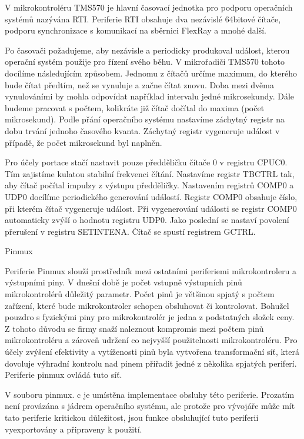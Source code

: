 V mikrokontroléru TMS570 je hlavní časovací jednotka pro podporu operačních systémů nazývána RTI.
Periferie RTI obsahuje dva nezávislé 64bitové čítače, podporu synchronizace s komunikací na sběrnici FlexRay a mnohé další.

Po časovači požadujeme, aby nezávisle a periodicky produkoval událost, kterou operační systém použije pro řízení svého běhu.
V mikrořadiči TMS570 tohoto docílíme následujícím způsobem.
Jednomu z čítačů určíme maximum, do kterého bude čítat předtím, než se vynuluje a začne čítat znovu.
Doba mezi dvěma vynulováními by mohla odpovídat například intervalu jedné mikrosekundy.
Dále budeme pracovat s počtem, kolikráte již čítač dočítal do maxima (počet mikrosekund).
Podle přání operačního systému nastavíme záchytný registr na dobu trvání jednoho časového kvanta.
Záchytný registr vygeneruje událost v případě, že počet mikrosekund byl naplněn.

Pro účely portace stačí nastavit pouze předděličku čítače 0 v registru CPUC0.
Tím zajistíme kulatou stabilní frekvenci čítání.
Nastavíme registr TBCTRL tak, aby čítač počítal impulzy z výstupu předděličky.
Nastavením registrů COMP0 a UDP0 docílíme periodického generování událostí.
Registr COMP0 obsahuje číslo, při kterém čítač vygeneruje událost.
Při vygenerování události se registr COMP0 automaticky zvýší o hodnotu registru UDP0.
Jako poslední se nastaví povolení přerušení v registru SETINTENA.
Čítač se spustí registrem GCTRL.

\secc    Pinmux

Periferie Pinmux slouží prostředník mezi ostatními periferiemi mikrokontroleru a výstupními piny.
V dnešní době je počet vstupně výstupních pinů mikrokontrolérů důležitý parametr.
Počet pinů je většinou spjatý s počtem zařízení, které bude mikrokontroler schopen obsluhovat či kontrolovat.
Bohužel pouzdro s fyzickými piny pro mikrokontrolér je jedna z podstatných složek ceny.
Z tohoto důvodu se firmy snaží naleznout kompromis mezi počtem pinů mikrokontroléru a zároveň udržení co nejvyšší použitelnosti mikrokontroléru.
Pro účely zvýšení efektivity a vytíženosti pinů byla vytvořena transformační síť, která dovoluje výhradní kontrolu nad pinem přiřadit jedné z několika spjatých periferí.
Periferie pinmux ovládá tuto síť.

V souboru pinmux.
c je umístěna implementace obsluhy této periferie.
Prozatím není provázána s jádrem operačního systému, ale protože pro vývojáře může mít tato periferie kritickou důležitost, jsou funkce obsluhující tuto periferii vyexportovány a připraveny k použití.

